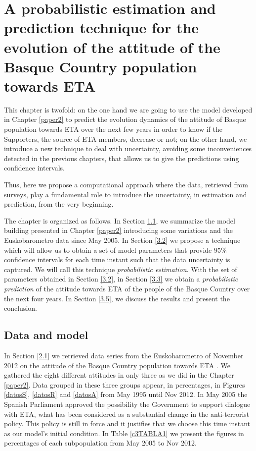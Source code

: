 \chapter{A probabilistic estimation and prediction technique for the evolution of the attitude of the Basque Country population towards ETA}\label{paper3}

This chapter is twofold: on the one hand we are going to use the model developed in Chapter \ref{paper2} to predict the evolution dynamics of the attitude of Basque population towards ETA over the next few years in order to know if the Supporters, the source of ETA members, decrease or not; on the other hand, we introduce a new technique to deal with uncertainty, avoiding some inconveniences detected in the previous chapters, that allows us to give the predictions using confidence intervals.  

Thus, here we propose a computational approach where the data, retrieved from surveys, play a fundamental role to introduce the uncertainty, in estimation and prediction, from the very beginning. 

The chapter is organized as follows. In Section \ref{3.1}, we summarize the model building presented in Chapter \ref{paper2} introducing some variations and the Euskobarometro data since May 2005. In Section \ref{3.2} we propose a technique which will allow us to obtain a set of model parameters that provide $95\%$ confidence intervals for each time instant such that the data uncertainty is captured. We will call this technique \textit{probabilistic estimation}. With the set of parameters obtained in Section \ref{3.2}, in Section \ref{3.3} we obtain a \textit{probabilistic prediction} of the attitude towards ETA of the people of the Basque Country over the next four years. In Section \ref{3.5}, we discuss the results and present the conclusion.

\section{Data and model}\label{3.1}
In Section \ref{2.1} we retrieved data series from the Euskobarometro of November 2012 on the attitude of the Basque Country population towards ETA \cite[Table 20]{eusko}. We gathered the eight different attitudes in only three as we did in the Chapter \ref{paper2}. Data grouped in these three groups appear, in percentages, in Figures \ref{datosS}, \ref{datosR} and \ref{datosA} from May 1995 until Nov 2012. In May 2005 the Spanish Parliament approved the possibility the Government to support dialogue with ETA, what has been considered as a substantial change in the anti-terrorist policy. This policy is still in force and it justifies that we choose this time instant as our model's initial condition. In Table \ref{c3TABLA1} we present the figures in percentages of each subpopulation from May 2005 to Nov 2012.

